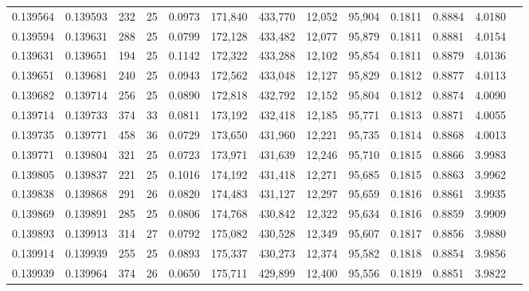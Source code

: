 \begin{tabular}{rrrrrrrrrrrrr}
0.139564 & 0.139593 & 232 &  25 &                                     0.0973 & 171,840 & 433,770 &  12,052 &  95,904 & 0.1811 & 0.8884 & 4.0180 \\
0.139594 & 0.139631 & 288 &  25 &                                     0.0799 & 172,128 & 433,482 &  12,077 &  95,879 & 0.1811 & 0.8881 & 4.0154 \\
0.139631 & 0.139651 & 194 &  25 &                                     0.1142 & 172,322 & 433,288 &  12,102 &  95,854 & 0.1811 & 0.8879 & 4.0136 \\
0.139651 & 0.139681 & 240 &  25 &                                     0.0943 & 172,562 & 433,048 &  12,127 &  95,829 & 0.1812 & 0.8877 & 4.0113 \\
0.139682 & 0.139714 & 256 &  25 &                                     0.0890 & 172,818 & 432,792 &  12,152 &  95,804 & 0.1812 & 0.8874 & 4.0090 \\
0.139714 & 0.139733 & 374 &  33 &                                     0.0811 & 173,192 & 432,418 &  12,185 &  95,771 & 0.1813 & 0.8871 & 4.0055 \\
0.139735 & 0.139771 & 458 &  36 &                                     0.0729 & 173,650 & 431,960 &  12,221 &  95,735 & 0.1814 & 0.8868 & 4.0013 \\
0.139771 & 0.139804 & 321 &  25 &                                     0.0723 & 173,971 & 431,639 &  12,246 &  95,710 & 0.1815 & 0.8866 & 3.9983 \\
0.139805 & 0.139837 & 221 &  25 &                                     0.1016 & 174,192 & 431,418 &  12,271 &  95,685 & 0.1815 & 0.8863 & 3.9962 \\
0.139838 & 0.139868 & 291 &  26 &                                     0.0820 & 174,483 & 431,127 &  12,297 &  95,659 & 0.1816 & 0.8861 & 3.9935 \\
0.139869 & 0.139891 & 285 &  25 &                                     0.0806 & 174,768 & 430,842 &  12,322 &  95,634 & 0.1816 & 0.8859 & 3.9909 \\
0.139893 & 0.139913 & 314 &  27 &                                     0.0792 & 175,082 & 430,528 &  12,349 &  95,607 & 0.1817 & 0.8856 & 3.9880 \\
0.139914 & 0.139939 & 255 &  25 &                                     0.0893 & 175,337 & 430,273 &  12,374 &  95,582 & 0.1818 & 0.8854 & 3.9856 \\
0.139939 & 0.139964 & 374 &  26 &                                     0.0650 & 175,711 & 429,899 &  12,400 &  95,556 & 0.1819 & 0.8851 & 3.9822 \\

\end{tabular}
